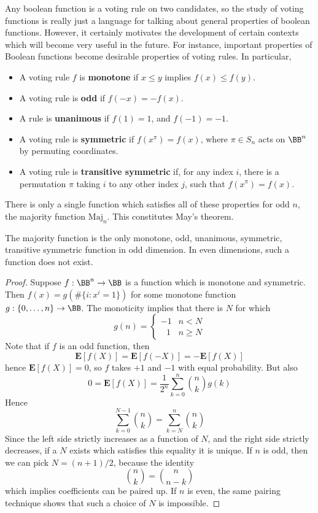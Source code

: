 Any boolean function is a voting rule on two candidates, so the study of voting functions is really just a language for talking about general properties of boolean functions. However, it certainly motivates the development of certain contexts which will become very useful in the future. For instance, important properties of Boolean functions become desirable properties of voting rules. In particular,
%
\begin{itemize}
    \item A voting rule $f$ is {\bf monotone} if $x \leq y$ implies $f(x) \leq f(y)$.
    \item A voting rule is {\bf odd} if $f(-x) = -f(x)$.
    \item A rule is {\bf unanimous} if $f(1) = 1$, and $f(-1) = -1$.
    \item A voting rule is {\bf symmetric} if $f(x^\pi) = f(x)$, where $\pi \in S_n$ acts on $\BB^n$ by permuting coordinates.
    \item A voting rule is {\bf transitive symmetric} if, for any index $i$, there is a permutation $\pi$ taking $i$ to any other index $j$, such that $f(x^\pi) = f(x)$.
\end{itemize}
%
There is only a single function which satisfies all of these properties for odd $n$, the majority function $\text{Maj}_n$. This constitutes May's theorem.

\begin{theorem}
    The majority function is the only monotone, odd, unanimous, symmetric, transitive symmetric function in odd dimension. In even dimensions, such a function does not exist.
\end{theorem}
\begin{proof}
    Suppose $f: \BB^n \to \BB$ is a function which is monotone and symmetric. Then $f(x) = g(\# \{ i : x^i = 1 \})$ for some monotone function $g: \{ 0, \dots, n \} \to \BB$. The monoticity implies that there is $N$ for which
    \[ g(n) = \begin{cases} -1 & n < N \\ \ \ \ 1 & n \geq N \end{cases} \]
    Note that if $f$ is an odd function, then
    \[ \mathbf{E}[f(X)] = \mathbf{E}[f(-X)] = - \mathbf{E}[f(X)] \]
    hence $\mathbf{E}[f(X)] = 0$, so $f$ takes $+1$ and $-1$ with equal probability. But also
    \[ 0 = \mathbf{E}[f(X)] = \frac{1}{2^n} \sum_{k = 0}^n {n \choose k} g(k) \]
    Hence
    \[ \sum_{k = 0}^{N-1} {n \choose k} = \sum_{k = N}^n {n \choose k} \]
    Since the left side strictly increases as a function of $N$, and the right side strictly decreases, if a $N$ exists which satisfies this equality it is unique. If $n$ is odd, then we can pick $N = (n+1)/2$, because the identity
    \[ {n \choose k} = {n \choose n-k} \]
    which implies coefficients can be paired up. If $n$ is even, the same pairing technique shows that such a choice of $N$ is impossible.
\end{proof}

